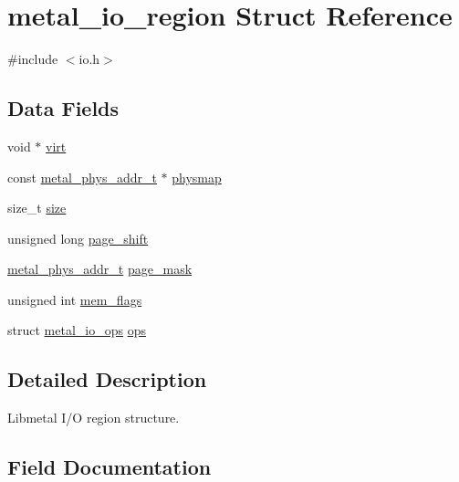 \hypertarget{structmetal__io__region}{}\section{metal\+\_\+io\+\_\+region Struct Reference}
\label{structmetal__io__region}


{\ttfamily \#include $<$io.\+h$>$}

\subsection*{Data Fields}
\begin{DoxyCompactItemize}
\item 
void $\ast$ \hyperlink{structmetal__io__region_aaa1ddf24b37d257080e3db253f82d760}{virt}
\item 
const \hyperlink{group__system_gae024fa10b72199a3e26c29b6eb97df5d}{metal\+\_\+phys\+\_\+addr\+\_\+t} $\ast$ \hyperlink{structmetal__io__region_a129e040d18e8e6570ed5ce2b7c258e86}{physmap}
\item 
size\+\_\+t \hyperlink{structmetal__io__region_a131ebc3df546c6e87b1f833882d9fc1e}{size}
\item 
unsigned long \hyperlink{structmetal__io__region_a78412204cb2dd9ebed613b3273b9ab1b}{page\+\_\+shift}
\item 
\hyperlink{group__system_gae024fa10b72199a3e26c29b6eb97df5d}{metal\+\_\+phys\+\_\+addr\+\_\+t} \hyperlink{structmetal__io__region_ae10d7c45fa9e87d93dbb01e87cd7f822}{page\+\_\+mask}
\item 
unsigned int \hyperlink{structmetal__io__region_a457b7d189af94966273824a9a95b1cc1}{mem\+\_\+flags}
\item 
struct \hyperlink{structmetal__io__ops}{metal\+\_\+io\+\_\+ops} \hyperlink{structmetal__io__region_a8d0a8ff10072b864af2ea913d135faf1}{ops}
\end{DoxyCompactItemize}


\subsection{Detailed Description}
Libmetal I/O region structure. 

\subsection{Field Documentation}
\mbox{\label{structmetal__io__region_a457b7d189af94966273824a9a95b1cc1}} 
